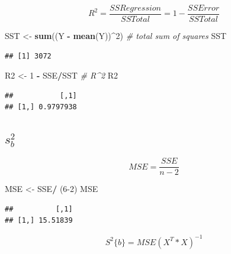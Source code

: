 \documentclass[
]{article}
\newenvironment{Shaded}{\begin{snugshade}}{\end{snugshade}}
\newcommand{\CommentTok}[1]{\textcolor[rgb]{0.56,0.35,0.01}{\textit{#1}}}
\newcommand{\DecValTok}[1]{\textcolor[rgb]{0.00,0.00,0.81}{#1}}
\newcommand{\KeywordTok}[1]{\textcolor[rgb]{0.13,0.29,0.53}{\textbf{#1}}}
\newcommand{\NormalTok}[1]{#1}
\newcommand{\OperatorTok}[1]{\textcolor[rgb]{0.81,0.36,0.00}{\textbf{#1}}}
\newcommand{\StringTok}[1]{\textcolor[rgb]{0.31,0.60,0.02}{#1}}
\begin{document}
\[
R^2 = \frac{SSRegression}{SSTotal} = 1 - \frac{SSError}{SSTotal}
\]

\begin{Shaded}
\begin{Highlighting}[]
\NormalTok{SST <-}\StringTok{ }\KeywordTok{sum}\NormalTok{((Y }\OperatorTok{-}\StringTok{ }\KeywordTok{mean}\NormalTok{(Y))}\OperatorTok{^}\DecValTok{2}\NormalTok{) }\CommentTok{# total sum of squares}
\NormalTok{SST}
\end{Highlighting}
\end{Shaded}

\begin{verbatim}
## [1] 3072
\end{verbatim}

\begin{Shaded}
\begin{Highlighting}[]
\NormalTok{R2 <-}\StringTok{ }\DecValTok{1} \OperatorTok{-}\StringTok{ }\NormalTok{SSE}\OperatorTok{/}\NormalTok{SST }\CommentTok{# R^2}
\NormalTok{R2}
\end{Highlighting}
\end{Shaded}

\begin{verbatim}
##           [,1]
## [1,] 0.9797938
\end{verbatim}

\hypertarget{s2_b}{%
\subsection{\texorpdfstring{\textbf{\(s^2_b\)}}{s\^{}2\_b}}\label{s2_b}}

\[
MSE = \frac{SSE}{n-2}
\]

\begin{Shaded}
\begin{Highlighting}[]
\NormalTok{MSE <-}\StringTok{ }\NormalTok{SSE}\OperatorTok{/}\StringTok{ }\NormalTok{(}\DecValTok{6-2}\NormalTok{)}
\NormalTok{MSE}
\end{Highlighting}
\end{Shaded}

\begin{verbatim}
##          [,1]
## [1,] 15.51839
\end{verbatim}

\[
S^2\{b\} = MSE(X^T * X)^{-1}
\]

\begin{Shaded}
\end{Shaded}
\end{document}
